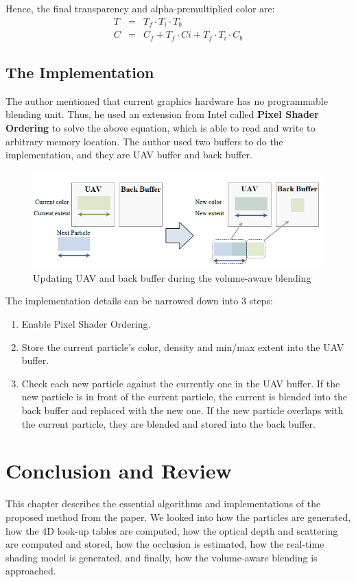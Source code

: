 Hence, the final transparency and alpha-premultiplied color are:
\begin{eqnarray}
T &=& T_f\cdot T_i\cdot T_b\\
C &=& C_f + T_f \cdot Ci + T_f \cdot T_i \cdot C_b
\end{eqnarray}

\subsection{The Implementation}
The author mentioned that current graphics hardware has no programmable blending unit. Thus, he used an extension from Intel called \textbf{Pixel Shader Ordering} to solve the above equation, which is able to read and write to arbitrary memory location. The author used two buffers to do the implementation, and they are UAV buffer and back buffer.

\begin{figure}[htp]
\begin{center}
\includegraphics[scale=0.8]{images/uvabuffer.png}
\caption{Updating UAV and back buffer during the
volume-aware blending}
\label{f16}
\end{center}
\end{figure}

The implementation details can be narrowed down into 3 steps:
\begin{enumerate}
\item Enable Pixel Shader Ordering.
\item Store the current particle's color, density and min/max extent into the UAV buffer.
\item Check each new particle against the currently one in the UAV buffer. If the new particle is in front of the current particle, the current is blended into the back buffer and replaced with the new one. If the new particle overlaps with the current particle, they are blended and stored into the back buffer.
\end{enumerate}

\section{Conclusion and Review}
This chapter describes the essential algorithms and implementations of the proposed method from the paper. We looked into how the particles are generated, how the 4D look-up tables are computed, how the optical depth and scattering are computed and stored, how the occlusion is estimated, how the real-time shading model is generated, and finally, how the volume-aware blending is approached.

